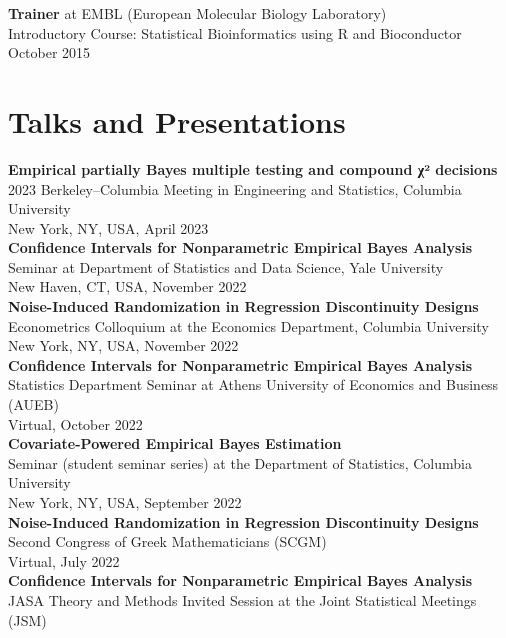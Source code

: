 \documentclass[margin,line]{res}
\newcommand{\ver}{\vspace*{-2.7mm}}
\begin{document}
\begin{resume}
\ver
\textbf{Trainer} at EMBL (European Molecular Biology Laboratory)\\
Introductory Course: Statistical Bioinformatics using R and Bioconductor \hfill October 2015

\section{\sc Talks and Presentations}
\begin{adjustwidth*}{0pt}{0pt}
 
\textbf{Empirical partially Bayes multiple testing and compound χ² decisions} \\
2023 Berkeley–Columbia Meeting in Engineering and Statistics, Columbia University \\
New York, NY, USA, April 2023
 \\
\textbf{Confidence Intervals for Nonparametric Empirical Bayes Analysis} \\
Seminar at Department of Statistics and Data Science, Yale University \\
New Haven, CT, USA, November 2022
 \\
\textbf{Noise-Induced Randomization in Regression Discontinuity Designs} \\
Econometrics Colloquium at the Economics Department, Columbia University \\
New York, NY, USA, November 2022
 \\
\textbf{Confidence Intervals for Nonparametric Empirical Bayes Analysis} \\
Statistics Department Seminar at Athens University of Economics and Business (AUEB) \\
Virtual, October 2022
 \\
\textbf{Covariate-Powered Empirical Bayes Estimation} \\
Seminar (student seminar series) at the Department of Statistics, Columbia University \\
New York, NY, USA, September 2022
 \\
\textbf{Noise-Induced Randomization in Regression Discontinuity Designs} \\
Second Congress of Greek Mathematicians (SCGM) \\
Virtual, July 2022
 \\
\textbf{Confidence Intervals for Nonparametric Empirical Bayes Analysis} \\
JASA Theory and Methods Invited Session at the Joint Statistical Meetings (JSM) \\

\end{adjustwidth*}
\end{resume}
\end{document}
